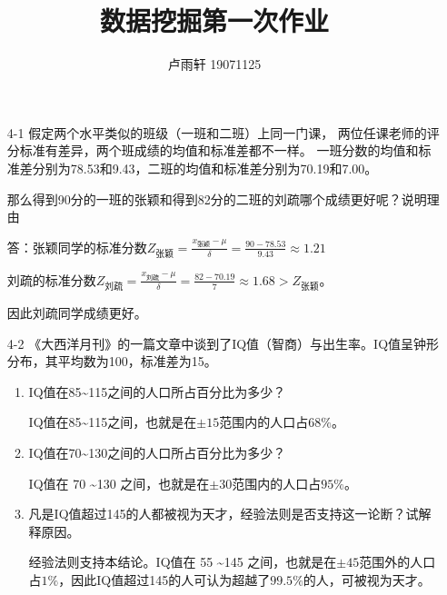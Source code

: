 \documentclass{ctexart}
\title{数据挖掘第一次作业}
\author{卢雨轩 19071125}
\begin{document}
\maketitle

\begin{enumerate}
  \item[4-1] 假定两个水平类似的班级（一班和二班）上同一门课，
  两位任课老师的评分标准有差异，两个班成绩的均值和标准差都不一样。
  一班分数的均值和标准差分别为78.53和9.43，二班的均值和标准差分别为70.19和7.00。

  那么得到90分的一班的张颖和得到82分的二班的刘疏哪个成绩更好呢？说明理由

    答：张颖同学的标准分数$Z_{张颖} = \frac{x_{张颖} - \mu}{\delta} = \frac{90 - 78.53}{9.43} \approx 1.21$

    刘疏的标准分数$Z_{刘疏} = \frac{x_{刘疏} - \mu}{\delta} = \frac{82 - 70.19}{7} \approx 1.68 > Z_{张颖}$。

    因此刘疏同学成绩更好。
  
    \item[4-2] 《大西洋月刊》的一篇文章中谈到了IQ值（智商）与出生率。IQ值呈钟形分布，其平均数为100，标准差为15。
    \begin{enumerate}
      \item IQ值在85\textasciitilde 115之间的人口所占百分比为多少？
      
      IQ值在85\textasciitilde 115之间，也就是在$\pm 15$范围内的人口占$68\%$。
      \item IQ值在70\textasciitilde 130之间的人口所占百分比为多少？
      
      IQ值在 70 \textasciitilde 130 之间，也就是在$\pm 30$范围内的人口占$95\%$。

      \item 凡是IQ值超过145的人都被视为天才，经验法则是否支持这一论断？试解释原因。
      
      经验法则支持本结论。IQ值在 55 \textasciitilde 145 之间，也就是在$\pm 45$范围外的人口占$1\%$，因此IQ值超过145的人可认为超越了$99.5\%$的人，可被视为天才。
    \end{enumerate}
\end{enumerate}
\end{document}
